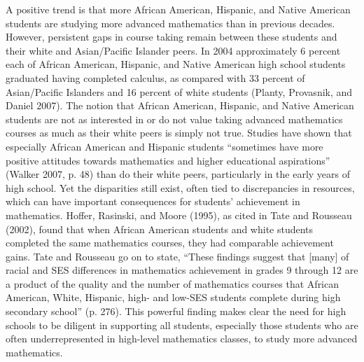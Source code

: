 \documentclass[
  10pt,
  a4paper,
  landscape,
  twoside,
  openany
]{scrbook}
\newcommand{\EN}[1]{#1}
\begin{document}
\TriPara
{
\EN{A positive trend is that more African American, Hispanic, and Native American students are studying more advanced mathematics than in previous decades. However, persistent gaps in course taking remain between these students and their white and Asian/Pacific Islander peers. In 2004 approximately 6 percent each of African American, Hispanic, and Native American high school students graduated having completed calculus, as compared with 33 percent of Asian/Pacific Islanders and 16 percent of white students (Planty, Provasnik, and Daniel 2007). The notion that African American, Hispanic, and Native American students are not as interested in or do not value taking advanced mathematics courses as much as their white peers is simply not true. Studies have shown that especially African American and Hispanic students “sometimes have more positive attitudes towards mathematics and higher educational aspirations” (Walker 2007, p. 48) than do their white peers, particularly in the early years of high school. Yet the disparities still exist, often tied to discrepancies in resources, which can have important consequences for students' achievement in mathematics. Hoffer, Rasinski, and Moore (1995), as cited in Tate and Rousseau (2002), found that when African American students and white students completed the same mathematics courses, they had comparable achievement gains. Tate and Rousseau go on to state, “These findings suggest that [many] of racial and SES differences in mathematics achievement in grades 9 through 12 are a product of the quality and the number of mathematics courses that African American, White, Hispanic, high- and low-SES students complete during high secondary school” (p. 276). This powerful finding makes clear the need for high schools to be diligent in supporting all students, especially those students who are often underrepresented in high-level mathematics classes, to study more advanced mathematics.}
}
\end{document}
